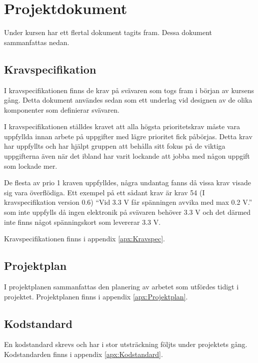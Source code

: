 \section{Projektdokument}
Under kursen har ett flertal dokument tagits fram. Dessa dokument sammanfattas nedan.
\subsection{Kravspecifikation}
I kravspecifikationen finns de krav på svävaren som togs fram i början av kursens gång. 
Detta dokument användes sedan som ett underlag vid designen av de olika
komponenter som definierar svävaren.

I kravspecifikationen ställdes kravet att alla högsta prioritetskrav måste vara uppfyllda innan 
arbete på uppgifter med lägre prioritet fick påbörjas. Detta krav har uppfyllts och har hjälpt 
gruppen att behålla sitt fokus på de viktiga uppgifterna även när det ibland har varit lockande 
att jobba med någon uppgift som lockade mer.

De flesta av prio 1 kraven uppfylldes, några undantag fanns då vissa krav visade
sig vara överflödiga.
Ett exempel på ett sådant krav är krav 54 (I kravspecifikation version 0.6) ``Vid 3.3 V får spänningen
avvika med max 0.2 V.'' som inte uppfylls då ingen elektronik på svävaren
behöver 3.3 V och det därmed inte finns något spänningskort som levererar 3.3 V.

Kravspecifikationen finns i appendix \ref{apx:Kravspec}.
\subsection{Projektplan}
I projektplanen sammanfattas den planering av arbetet som utfördes tidigt i
projektet. Projektplanen finns i appendix \ref{apx:Projektplan}.
\subsection{Kodstandard}
En kodstandard skrevs och har i stor utsträckning följts under projektets gång.
Kodstandarden finns i appendix \ref{apx:Kodstandard}.
